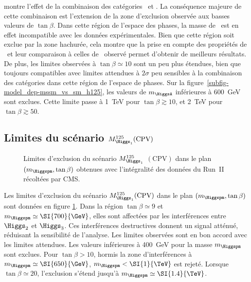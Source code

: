 montre l'effet de la combinaison des catégories \CATbsm\ et \CATsm.
La conséquence majeure de cette combinaison est l'extension de la zone d'exclusion observée aux basses valeurs de $\tan\beta$.
Dans cette région de l'espace des phases, la masse de \higgsMSSM\ est en effet incompatible avec les données expérimentales.
Bien que cette région soit exclue par la zone hachurée,
cela montre que la prise en compte des propriétés de \higgsMSSM\
et leur comparaison à celles de \higgs\ observé permet d'obtenir de meilleurs résultats.
De plus, les limites observées à $\tan\beta\simeq\num{10}$ sont un peu plus étendues,
bien que toujours compatibles avec limites attendues à $2\sigma$
peu sensibles à la combinaison des catégories dans cette région de l'espace de phases.
Sur la figure~\ref{subfig-model_dep-mssm_vs_sm_h125},
les valeurs de $m_{\HiggsA}$ inférieures à \SI{600}{\GeV} sont exclues.
Cette limite passe à \SI{1}{\TeV} pour $\tan\beta\gtrsim\num{10}$,
et \SI{2}{\TeV} pour $\tan\beta\gtrsim\num{50}$.
\subsection[Limites du scénario $M_{\Higgs_1}^{125}$ avec violation de $CP$]{Limites du scénario $M_{\Higgs_1}^{125}(\text{CPV})$}
\begin{wrapfigure}[16]{R}{.475\textwidth}
\vspace{-3\baselineskip}
\centering
{}
\caption[Limites d'exclusion du scénario $M_{\Higgs_1}^{125}(\text{CPV})$.]{Limites d'exclusion du scénario $M_{\Higgs_1}^{125}$ $(\text{CPV})$ dans le plan $(m_{\Higgspm},\tan\beta)$ obtenues avec l'intégralité des données du Run~II récoltées par CMS.}
\label{fig-model_dep-CPV}
\end{wrapfigure}
Les limites d'exclusion du scénario $M_{\Higgs_1}^{125}(\text{CPV})$ dans le plan $(m_{\Higgspm},\tan\beta)$
sont données en figure \ref{fig-model_dep-CPV}.
Dans la région $\tan\beta\simeq\num{9}$ et $m_{\Higgspm}\simeq\SI{700}{\GeV}$,
elles sont affectées par les interférences entre $\Higgs_2$ et $\Higgs_3$.
Ces interférences destructives donnent un signal atténué, réduisant la sensibilité de l'analyse.
Les limites observées sont en bon accord avec les limites attendues.
Les valeurs inférieures à \SI{400}{\GeV} pour la masse $m_{\Higgspm}$ sont exclues.
Pour $\tan\beta>\num{10}$,
hormis la zone d'interférences à $m_{\Higgspm} \simeq \SI{650}{\GeV}$,
$m_{\Higgspm} < \SI{1}{\TeV}$ est rejeté.
Lorsque
$\tan\beta\simeq\num{20}$,
l'exclusion s'étend jusqu'à
$m_{\Higgspm} \simeq \SI{1.4}{\TeV}$.

